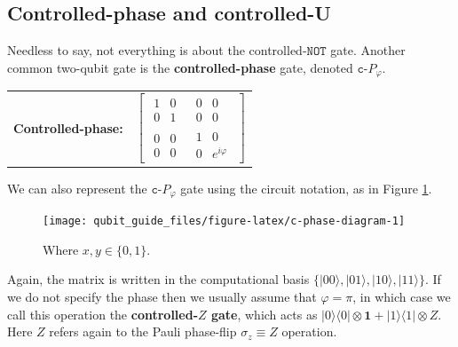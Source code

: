 \documentclass[fleqn,a4paper]{article}
\newenvironment{idea}{\everypar{\setlength{\parindent}{1.5em}}}{}
\theoremstyle{definition}
\theoremstyle{definition}
\theoremstyle{definition}
\theoremstyle{definition}
\theoremstyle{remark}
\begin{document}
\hypertarget{controlled-phase-and-controlled-u}{%
\subsection{Controlled-phase and controlled-U}\label{controlled-phase-and-controlled-u}}

Needless to say, not everything is about the controlled-\(\texttt{NOT}\) gate.
Another common two-qubit gate is the \textbf{controlled-phase} gate, denoted \(\texttt{c-}P_\varphi\).

\begin{idea}

\centering
\begin{tabular}{ll}
  \textbf{Controlled-phase:}
  & $\left[\begin{array}{c|c}\begin{matrix}1&0\\0&1\end{matrix}&\begin{matrix}0&0\\0&0\end{matrix}\\\hline\begin{matrix}0&0\\0&0\end{matrix}&\begin{matrix}1&0\\0&e^{i\varphi}\end{matrix}\end{array}\right]$
\end{tabular}

\end{idea}

We can also represent the \(\texttt{c-}P_\varphi\) gate using the circuit notation, as in Figure \ref{fig:c-phase-diagram}.



\begin{figure}[H]

{\centering \texttt{[image: qubit\_guide\_files/figure-latex/c-phase-diagram-1]} 

}

\caption{Where \(x,y\in\{0,1\}\).}\label{fig:c-phase-diagram}
\end{figure}

Again, the matrix is written in the computational basis \(\{|00\rangle,|01\rangle,|10\rangle,|11\rangle\}\).
If we do not specify the phase then we usually assume that \(\varphi=\pi\), in which case we call this operation the \textbf{controlled-\(Z\) gate}, which acts as \(|0\rangle\langle 0|\otimes\mathbf{1}+ |1\rangle\langle 1|\otimes Z\).
Here \(Z\) refers again to the Pauli phase-flip \(\sigma_z\equiv Z\) operation.
\end{document}
